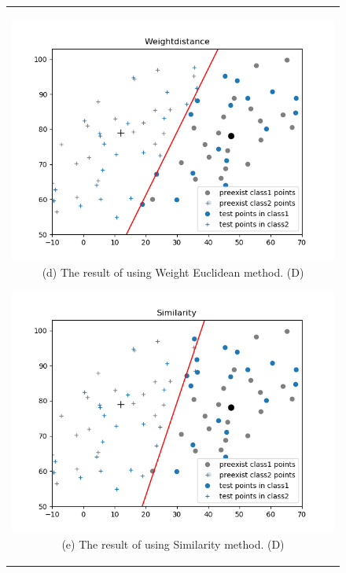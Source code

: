 \documentclass[10.5pt]{jsarticle}
\begin{document}
 \begin{figure}[htbp]
   \centering
   \begin{tabular}{c}
   	\begin{minipage}{0.56\hsize}
   	\centering
   		\includegraphics[width=15.0cm, bb=9 9 700 270]{results/WeightdistanceResultFigureD.png}
   		\hspace{0cm} (d) The result of using Weight Euclidean method. (D)
   	\end{minipage}

   	\begin{minipage}{0.5\hsize}
   	\centering
   		\includegraphics[width=15.0cm, bb=9 9 700 270]{results/SimilarityResultFigureD.png}
   		\hspace{0cm} (e) The result of using Similarity method. (D)
   	\end{minipage}
   \end{tabular}
 \end{figure}
\end{document}
